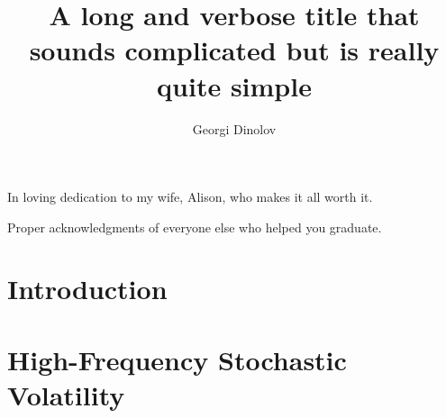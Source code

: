 



\title{A long and verbose title that sounds complicated but is really quite simple}
\author{Georgi Dinolov}
\deanlinethree{}

\begin{frontmatter}
\maketitle

\copyrightpage

\tableofcontents

\listoffigures

\listoftables

\begin{abstract}

\end{abstract}

\begin{dedication}
\vspace*{\fill}
\begin{center}
  In loving dedication to my wife, Alison, who makes it all worth it.
\end{center}
\vspace*{\fill}
\end{dedication}

\begin{acknowledgements}
Proper acknowledgments of everyone else who helped you graduate.
\end{acknowledgements}

\end{frontmatter}

\chapter{Introduction}


\chapter{High-Frequency Stochastic Volatility}

  
